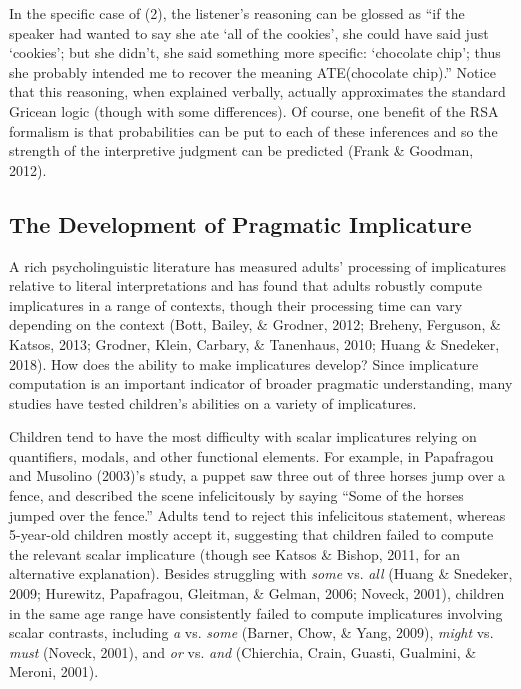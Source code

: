\documentclass[man]{apa6}
\theoremstyle{definition}
\theoremstyle{definition}
\theoremstyle{definition}
\theoremstyle{remark}
\begin{document}
In the specific case of (2), the listener's reasoning can be glossed as
\enquote{if the speaker had wanted to say she ate \enquote{all of the
cookies}, she could have said just \enquote{cookies}; but she didn't,
she said something more specific: \enquote{chocolate chip}; thus she
probably intended me to recover the meaning ATE(chocolate chip).} Notice
that this reasoning, when explained verbally, actually approximates the
standard Gricean logic (though with some differences). Of course, one
benefit of the RSA formalism is that probabilities can be put to each of
these inferences and so the strength of the interpretive judgment can be
predicted (Frank \& Goodman, 2012).

\subsection{The Development of Pragmatic
Implicature}\label{the-development-of-pragmatic-implicature}

A rich psycholinguistic literature has measured adults' processing of
implicatures relative to literal interpretations and has found that
adults robustly compute implicatures in a range of contexts, though
their processing time can vary depending on the context (Bott, Bailey,
\& Grodner, 2012; Breheny, Ferguson, \& Katsos, 2013; Grodner, Klein,
Carbary, \& Tanenhaus, 2010; Huang \& Snedeker, 2018). How does the
ability to make implicatures develop? Since implicature computation is
an important indicator of broader pragmatic understanding, many studies
have tested children's abilities on a variety of implicatures.

Children tend to have the most difficulty with scalar implicatures
relying on quantifiers, modals, and other functional elements. For
example, in Papafragou and Musolino (2003)'s study, a puppet saw three
out of three horses jump over a fence, and described the scene
infelicitously by saying \enquote{Some of the horses jumped over the
fence.} Adults tend to reject this infelicitous statement, whereas
5-year-old children mostly accept it, suggesting that children failed to
compute the relevant scalar implicature (though see Katsos \& Bishop,
2011, for an alternative explanation). Besides struggling with
\emph{some} vs. \emph{all} (Huang \& Snedeker, 2009; Hurewitz,
Papafragou, Gleitman, \& Gelman, 2006; Noveck, 2001), children in the
same age range have consistently failed to compute implicatures
involving scalar contrasts, including \emph{a} vs. \emph{some} (Barner,
Chow, \& Yang, 2009), \emph{might} vs. \emph{must} (Noveck, 2001), and
\emph{or} vs. \emph{and} (Chierchia, Crain, Guasti, Gualmini, \& Meroni,
2001).
\end{document}
